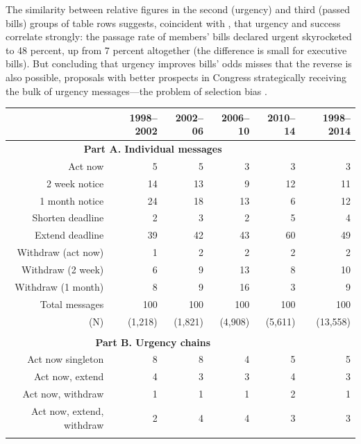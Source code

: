 \documentclass[letter,12pt]{article}
\begin{document}
The similarity between relative figures in the second (urgency) and third (passed bills) groups of table rows suggests, coincident with \citet{aleman.navia.UrgChi.2009}, that urgency and success correlate strongly: the passage rate of members' bills declared urgent skyrocketed to 48 percent, up from 7 percent altogether (the difference is small for executive bills). But concluding that urgency improves bills' odds misses that the reverse is also possible, proposals with better prospects in Congress strategically receiving the bulk of urgency messages---the problem of selection bias \citep[cf.][]{jacobson.kernell.1983}. 

\begin{table}
\centering
\begin{tabular}{rrrrr|r}
      & 1998--2002 & 2002--06 & 2006--10 & 2010--14 & 1998--2014 \\ \hline
 \multicolumn{5}{c|}{\textbf{Part A. Individual messages}} \\
 Act now             & 5  & 5  & 3  & 3  & 3 \\ 
 2 week notice       & 14 & 13 & 9  & 12 & 11 \\ 
 1 month notice      & 24 & 18 & 13 & 6  & 12 \\ \hdashline
 Shorten deadline    & 2  & 3  & 2  & 5  &  4 \\ 
 Extend deadline     & 39 & 42 & 43 & 60 & 49 \\ \hdashline
 Withdraw (act now)  & 1  & 2  & 2  & 2  &  2 \\ 
 Withdraw (2 week)   & 6  & 9  & 13 & 8  & 10 \\ 
 Withdraw (1 month)  & 8  & 9  & 16 & 3  & 9  \\ \hline
 Total messages      & 100 & 100 & 100 & 100 & 100 \\ 
(N)                  & (1,218) & (1,821) & (4,908) & (5,611) & (13,558)\\ 
\\ [-1.5ex]
 \multicolumn{5}{c|}{\textbf{Part B. Urgency chains}}  \\
Act now singleton         & 8  & 8  & 4  & 5  &   5  \\
Act now, extend           & 4  & 3  & 3  & 4  &   3  \\
Act now, withdraw         & 1  & 1  & 1  & 2  &   1  \\
Act now, extend, withdraw & 2  & 4  & 4  & 3  &   3  \\ \hdashline

\end{tabular}
\end{table}
\end{document}
